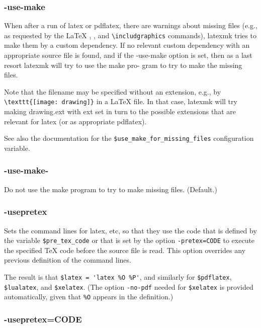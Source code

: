 \subsubsection{-use-make}

When  after a run of latex or pdflatex, there are warnings about missing files
(e.g., as requested by the LaTeX \verb||, \verb||, and  \verb|\includgraphics|
commands), latexmk tries to make them by a custom dependency. If no relevant
custom dependency with an  appropriate  source  file is found, and if the
-use-make option is set, then as a last resort latexmk will try to use the make
pro- gram to try to make the missing files.

Note  that  the  filename may be specified without an extension, e.g., by
\verb|\texttt{[image: drawing]}| in a  LaTeX  file.   In  that case,  latexmk  will
try making drawing.ext with ext set in turn to the possible extensions that are
relevant for  latex  (or  as appropriate pdflatex).

See  also  the documentation for the \verb|$use_make_for_missing_files| configuration
variable.


\subsubsection{-use-make-}

Do not use the make program to try to make missing files.   (Default.)


\subsubsection{-usepretex}

Sets the command lines for latex, etc, so that they use the code that is
defined by the variable \verb|$pre_tex_code| or that is set  by the option
\verb|-pretex=CODE| to execute the specified TeX code before the source file is read.
This  option  overrides  any  previous definition of the command lines.

The  result  is  that  \verb|$latex = 'latex %O %P'|, and similarly for
\verb|$pdflatex|, \verb|$lualatex|, and \verb|$xelatex|.  (The option \verb|-no-pdf|  needed
for \verb|$xelatex| is provided automatically, given that \verb|%O| appears in
the definition.)


\subsubsection{-usepretex=CODE}

